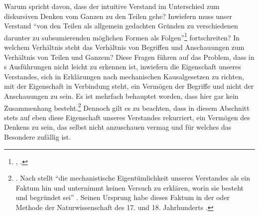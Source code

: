 Warum spricht  davon, dass der intuitive Verstand im
Unterschied zum diskursiven Denken vom Ganzen zu den Teilen gehe? Inwiefern muss
unser Verstand \enquote{von den Teilen als allgemein gedachten Gründen
zu verschiedenen darunter zu subsumierenden möglichen Formen als
Folgen}\footnote{\cite[][\S~77]{Kant:KritikderUrteilskraft2009},
\cite[][V: 407.26--27]{Kant:GesammelteWerke1900ff.}.} fortschreiten?
In welchem Verhältnis steht das Verhältnis von Begriffen und Anschauungen zum
Verhältnis von Teilen und Ganzem? Diese Fragen führen auf das Problem, dass in
s Ausführungen nicht leicht zu erkennen ist, inwiefern die
Eigenschaft unseres Verstandes, sich in Erklärungen nach mechanischen Kausalgesetzen zu
richten, mit der Eigenschaft in Verbindung steht, ein Vermögen der Begriffe und
nicht der Anschauungen zu sein. Es ist mehrfach behauptet worden, dass hier gar
kein Zusammenhang
besteht.\footnote{\cite[Vgl.][153--159]{McLaughlin:KantsKritikderteleologischenUrteilskraft1989}.
Nach  stellt
 \enquote{die mechanistische Eigentümlichkeit unseres
Verstandes als ein Faktum hin und unternimmt keinen Versuch zu erklären, worin
sie besteht und begründet sei}
\parencite[][157]{McLaughlin:KantsKritikderteleologischenUrteilskraft1989}.
Seinen Ursprung habe dieses Faktum in der 
oder  Methode der Naturwissenschaft des 17.
und 18. Jahrhunderts
\parencite[vgl.][\pno~157\,f.]{McLaughlin:KantsKritikderteleologischenUrteilskraft1989}.}
Dennoch gilt es zu beachten, dass  in diesem Abschnitt
stets auf eben diese Eigenschaft unseres Verstandes rekurriert, ein Vermögen des
Denkens zu sein, das selbst nicht anzuschauen vermag und für welches das
Besondere zufällig ist.

